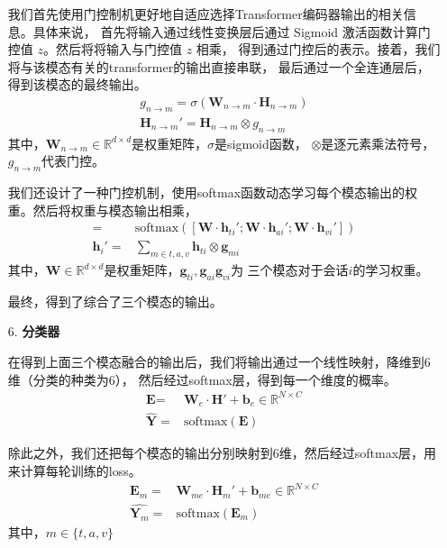 \documentclass[11pt]{article}
\begin{document}
\begin{enumerate}
                我们首先使用门控制机更好地自适应选择Transformer编码器输出的相关信息。具体来说，
                首先将输入通过线性变换层后通过 Sigmoid 激活函数计算门控值 $z$。然后将将输入与门控值 $z$ 相乘，
                得到通过门控后的表示。接着，我们将与该模态有关的transformer的输出直接串联，
                最后通过一个全连通层后，得到该模态的最终输出。
                \begin{align}
                    g_{n\rightarrow m} = \sigma(\textbf{W}_{n\rightarrow m}\cdot \textbf{H}_{n\rightarrow m})\\
                    \textbf{H}_{n\rightarrow m}' = \textbf{H}_{n\rightarrow m} \otimes g_{n\rightarrow m}
                \end{align}
                其中，$\textbf{W}_{n\rightarrow m} \in \mathbb{R}^{d\times d}$是权重矩阵，$\sigma$是sigmoid函数，
                $\otimes$是逐元素乘法符号，$g_{n\rightarrow m}$代表门控。

                我们还设计了一种门控机制，使用softmax函数动态学习每个模态输出的权重。然后将权重与模态输出相乘，
                \begin{align}
                    [g_{t_i};g_{a_i};g_{v_i}] =& \textrm{softmax}([\textbf{W}\cdot \textbf{h}_{ti}';\textbf{W}\cdot \textbf{h}_{ai}';\textbf{W}\cdot \textbf{h}_{vi}'])\\
                    \textbf{h}_i'  =& \sum_{m \in{t, a, v}}\textbf{h}_{ti}\otimes \textbf{g}_{mi}
                \end{align}
                其中，$\textbf{W} \in \mathbb{R}^{d\times d}$是权重矩阵，$\textbf{g}_{ti},\textbf{g}_{ai}\textbf{g}_{vi}$为
                三个模态对于会话$i$的学习权重。
                
                最终，得到了综合了三个模态的输出。

                \item [6. ]\textbf{分类器}\par
                在得到上面三个模态融合的输出后，我们将输出通过一个线性映射，降维到6维（分类的种类为6），
                然后经过softmax层，得到每一个维度的概率。
                \begin{align}
                    \textbf{E}=&\textbf{W}_e\cdot \textbf{H}' + \textbf{b}_e \in \mathbb{R}^{N\times C}\\
                    \hat{\textbf{Y}} =& \textrm{softmax}(\textbf{E}) 
                \end{align}
                
                除此之外，我们还把每个模态的输出分别映射到6维，然后经过softmax层，用来计算每轮训练的loss。
                \begin{align}
                    \textbf{E}_m=&\textbf{W}_{me}\cdot \textbf{H}_m' + \textbf{b}_{me} \in \mathbb{R}^{N\times C}\\
                    \widehat{\textbf{Y}_m} =& \textrm{softmax}(\textbf{E}_m) 
                \end{align}
                其中，$m \in \{t, a, v\}$


\end{enumerate}
\end{document}
